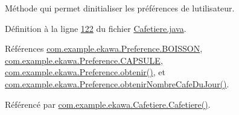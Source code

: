 Méthode qui permet d\textquotesingle{}initialiser les préférences de l\textquotesingle{}utilisateur. 



Définition à la ligne \hyperlink{_cafetiere_8java_source_l00122}{122} du fichier \hyperlink{_cafetiere_8java_source}{Cafetiere.\+java}.



Références \hyperlink{_preference_8java_source_l00032}{com.\+example.\+ekawa.\+Preference.\+B\+O\+I\+S\+S\+ON}, \hyperlink{_preference_8java_source_l00031}{com.\+example.\+ekawa.\+Preference.\+C\+A\+P\+S\+U\+LE}, \hyperlink{_preference_8java_source_l00052}{com.\+example.\+ekawa.\+Preference.\+obtenir()}, et \hyperlink{_preference_8java_source_l00063}{com.\+example.\+ekawa.\+Preference.\+obtenir\+Nombre\+Cafe\+Du\+Jour()}.



Référencé par \hyperlink{_cafetiere_8java_source_l00108}{com.\+example.\+ekawa.\+Cafetiere.\+Cafetiere()}.


